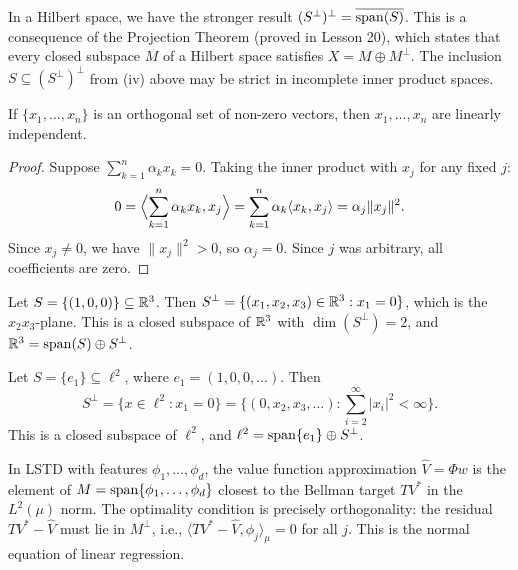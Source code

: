 \documentclass[11pt,a4paper]{article}
\begin{document}
\begin{remark}
\label{rem:double_perp}
In a Hilbert space, we have the stronger result
$(S^\perp)^\perp = \overline{\operatorname{span}(S)}$. This is a consequence of the
Projection Theorem (proved in Lesson 20), which states that every closed
subspace $M$ of a Hilbert space satisfies $X = M \oplus M^\perp$. The
inclusion $S \subseteq (S^\perp)^\perp$ from (iv) above may be strict in
incomplete inner product spaces.
\end{remark}

\begin{proposition}
\label{prop:orth_indep}
If $\{x_1, \ldots, x_n\}$ is an orthogonal set of non-zero vectors, then
$x_1, \ldots, x_n$ are linearly independent.
\end{proposition}

\begin{proof}
Suppose $\sum_{k=1}^n \alpha_k x_k = 0$. Taking the inner product with
$x_j$ for any fixed $j$:
\[
0 = \Bigl\langle \sum_{k=1}^n \alpha_k x_k, x_j \Bigr\rangle
= \sum_{k=1}^n \alpha_k \langle x_k, x_j \rangle
= \alpha_j \|x_j\|^2.
\]
Since $x_j \ne 0$, we have $\|x_j\|^2 > 0$, so $\alpha_j = 0$. Since $j$
was arbitrary, all coefficients are zero.
\end{proof}

\begin{example}
\label{ex:orth_R3}
Let $S = \{(1, 0, 0)\} \subseteq \mathbb{R}^3$. Then
$S^\perp = \{(x_1, x_2, x_3) \in \mathbb{R}^3 : x_1 = 0\}$, which is the
$x_2 x_3$-plane. This is a closed subspace of $\mathbb{R}^3$ with $\dim(S^\perp) =
2$, and $\mathbb{R}^3 = \operatorname{span}(S) \oplus S^\perp$.
\end{example}

\begin{example}
\label{ex:orth_ell2}
Let $S = \{e_1\} \subseteq \ell^2$, where $e_1 = (1, 0, 0, \ldots)$. Then
\[
S^\perp = \{x \in \ell^2 : x_1 = 0\}
= \{(0, x_2, x_3, \ldots) : \textstyle\sum_{i=2}^\infty |x_i|^2 < \infty\}.
\]
This is a closed subspace of $\ell^2$, and
$\ell^2 = \operatorname{span}\{e_1\} \oplus S^\perp$.
\end{example}

\begin{rlconnection}[title={Orthogonality in Value Function Approximation}]
In LSTD with features $\phi_1, \ldots, \phi_d$, the value function
approximation $\hat{V} = \Phi w$ is the element of
$M = \operatorname{span}\{\phi_1, \ldots, \phi_d\}$ closest to the Bellman target
$TV^*$ in the $L^2(\mu)$ norm. The optimality condition is precisely
orthogonality: the residual $TV^* - \hat{V}$ must lie in $M^\perp$,
i.e., $\langle TV^* - \hat{V}, \phi_j \rangle_\mu = 0$ for all $j$.
This is the normal equation of linear regression.
\end{rlconnection}
\end{document}
